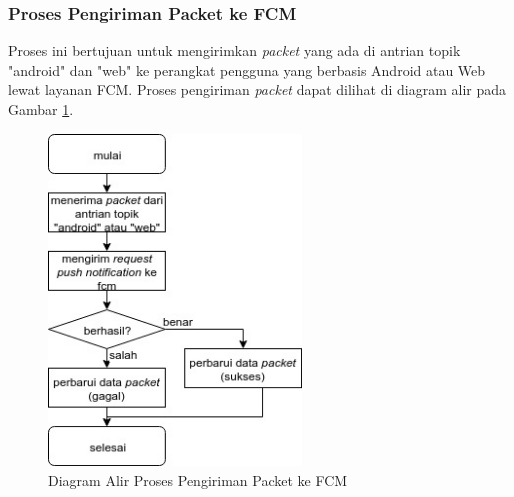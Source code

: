 \subsubsection{Proses Pengiriman Packet ke FCM}
\par Proses ini bertujuan untuk mengirimkan \textit{packet} yang ada di antrian topik "android" dan "web" ke perangkat pengguna yang berbasis Android atau Web lewat layanan FCM. Proses pengiriman \textit{packet} dapat dilihat di diagram alir pada Gambar \ref{flowchart_pengiriman_packet_ke_fcm}.
\begin{figure}[H]
    \centering\includegraphics[width=0.6\textwidth]{bab3/img/flowchart-pengiriman_packet_ke_fcm.jpg}
    \caption{Diagram Alir Proses Pengiriman Packet ke FCM} \label{flowchart_pengiriman_packet_ke_fcm}
\end{figure}
\clearpage

